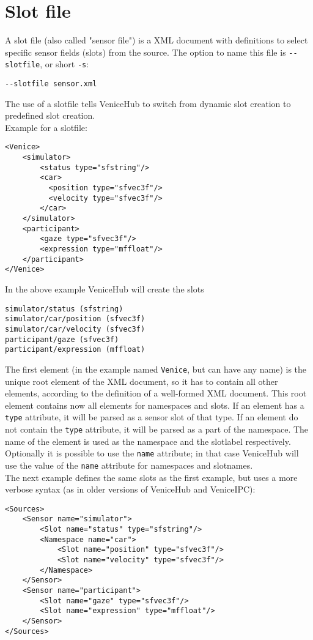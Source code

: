 \documentclass[german,a4paper]{article}
\begin{document}
\section{Slot file}
\label{sec:sensorfile}

A slot file (also called "sensor file") is a XML document with definitions to select specific sensor fields (slots) from the source. The option to name this file is \texttt{-\--slotfile}, or short \texttt{-s}:
\begin{lstlisting}
--slotfile sensor.xml
\end{lstlisting}
The use of a slotfile tells VeniceHub to switch from dynamic slot creation to predefined slot creation.\\
Example for a slotfile:
\begin{lstlisting}
<Venice>
    <simulator>
        <status type="sfstring"/>
        <car>
          <position type="sfvec3f"/>
          <velocity type="sfvec3f"/>
        </car>
    </simulator>
    <participant>
        <gaze type="sfvec3f"/>
        <expression type="mffloat"/>
    </participant>
</Venice>
\end{lstlisting}
In the above example VeniceHub will create the slots
\begin{lstlisting}
simulator/status (sfstring)
simulator/car/position (sfvec3f)
simulator/car/velocity (sfvec3f)
participant/gaze (sfvec3f)
participant/expression (mffloat)
\end{lstlisting}

The first element (in the example named \texttt{Venice}, but can have any name) is the unique root element of the XML document, so it has to contain all other elements, according to the definition of a well-formed XML document. This root element contains now all elements for namespaces and slots. If an element has a \texttt{type} attribute, it will be parsed as a sensor slot of that type. If an element do not contain the \texttt{type} attribute, it will be parsed as a part of the namespace. The name of the element is used as the namespace and the slotlabel respectively.\\
Optionally it is possible to use the \texttt{name} attribute; in that case VeniceHub will use the value of the \texttt{name} attribute for namespaces and slotnames.\\
The next example defines the same slots as the first example, but uses a more verbose syntax (as in older versions of VeniceHub and VeniceIPC):
\begin{lstlisting}
<Sources>
    <Sensor name="simulator">
        <Slot name="status" type="sfstring"/>
        <Namespace name="car">
            <Slot name="position" type="sfvec3f"/>
            <Slot name="velocity" type="sfvec3f"/>
        </Namespace>
    </Sensor>
    <Sensor name="participant">
        <Slot name="gaze" type="sfvec3f"/>
        <Slot name="expression" type="mffloat"/>
    </Sensor>
</Sources>
\end{lstlisting}
\end{document}

